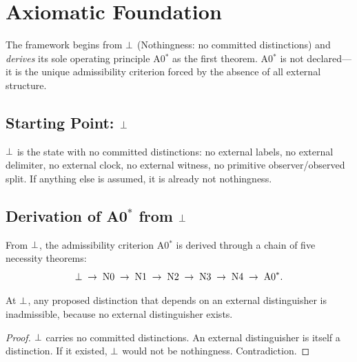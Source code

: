 
\section{Axiomatic Foundation}
\label{sec:axioms}

The \Opoch{} framework begins from $\bot$ (Nothingness: no committed
distinctions) and \emph{derives} its sole operating principle A0$^*$ as the
first theorem.  A0$^*$ is not declared---it is the unique admissibility
criterion forced by the absence of all external structure.

\subsection{Starting Point: $\bot$}
\label{sec:axioms:nothingness}

\begin{definition}
\label{def:nothingness-formal}
$\bot$ is the state with no committed distinctions:
no external labels, no external delimiter, no external clock, no external
witness, no primitive observer/observed split.  If anything else is assumed,
it is already not nothingness.
\end{definition}

\subsection{Derivation of A0$^*$ from $\bot$}
\label{sec:axioms:derivation}

From $\bot$, the admissibility criterion A0$^*$ is derived through a
chain of five necessity theorems:
\[
  \bot \;\to\; \text{N0} \;\to\; \text{N1} \;\to\; \text{N2}
  \;\to\; \text{N3} \;\to\; \text{N4} \;\to\; \text{A0}^*.
\]

\begin{theorem}[N0 --- No Externality]
\label{thm:N0}
At $\bot$, any proposed distinction that depends on an external
distinguisher is inadmissible, because no external distinguisher exists.
\begin{proof}
$\bot$ carries no committed distinctions.  An external distinguisher is
itself a distinction.  If it existed, $\bot$ would not be nothingness.
Contradiction.
\end{proof}
\end{theorem}

